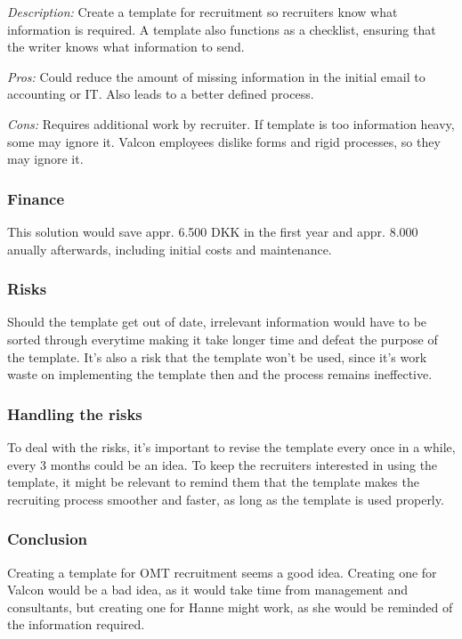 \emph{Description:} Create a template for recruitment so recruiters know what information is required. A template also functions as a checklist, ensuring that the writer knows what information to send.

\emph{Pros:} Could reduce the amount of missing information in the initial email to accounting or IT. 
Also leads to a better defined process.

\emph{Cons:} Requires additional work by recruiter. 
If template is too information heavy, some may ignore it.
Valcon employees dislike forms and rigid processes, so they may ignore it.

\subsubsection{Finance}
This solution would save appr. 6.500 DKK in the first year and appr. 8.000 anually afterwards, including initial costs and maintenance.

\subsubsection{Risks}
Should the template get out of date, irrelevant information would have to be sorted through everytime making it take longer time and defeat the purpose of the template. 
It's also a risk that the template won't be used, since it's work waste on implementing the template then and the process remains ineffective.

\subsubsection{Handling the risks}
To deal with the risks, it's important to revise the template every once in a while, every 3 months could be an idea.
To keep the recruiters interested in using the template, it might be relevant to remind them that the template makes the recruiting process smoother and faster, as long as the template is used properly.

\subsubsection{Conclusion} Creating a template for OMT recruitment seems a good idea.
Creating one for Valcon would be a bad idea, as it would take time from management and consultants, but creating one for Hanne might work, as she would be reminded of the information required.